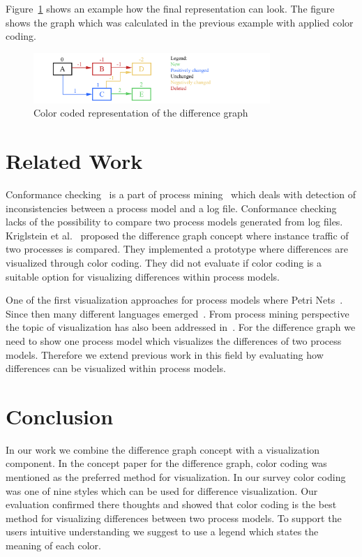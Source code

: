 \documentclass{llncs}
\begin{document}
Figure~\ref{fig:DiffGraphVisualization} shows an example how the final representation can look. The figure shows the graph which was calculated in the previous example with applied color coding.

\begin{figure}
	\centering
	\includegraphics[width=0.8\textwidth]{Images/ColorCodedGraph.PNG}
	\caption{Color coded representation of the difference graph}
	\label{fig:DiffGraphVisualization}
\end{figure}

\section{Related Work}  %
\label{sec:RelatedWork}

Conformance checking~\cite{lit:ConformanceCheckingOfProcesses} is a part of process mining~\cite{lit:PMDiscoveryConformanceEnhancement,lit:BusinnessProcessMiningAnIndustrialAppliction} which deals with detection of inconsistencies between a process model and a log file. Conformance checking lacks of the possibility to compare two process models generated from log files. Kriglstein et al.~\cite{lit:VisuApprDiffAnalysis} proposed the difference graph concept where instance traffic of two processes is compared. They implemented a prototype where differences are visualized through color coding. They did not evaluate if color coding is a suitable option for visualizing differences within process models.

One of the first visualization approaches for process models where Petri Nets~\cite{lit:Petrinet}. Since then many different languages emerged~\cite{lit:UML,lit:EPC,lit:YAWL}. From process mining perspective the topic of visualization has also been addressed in~\cite{lit:ProMFramework}. For the difference graph we need to show one process model which visualizes the differences of two process models. Therefore we extend previous work in this field by evaluating how differences can be visualized within process models.

\section{Conclusion} %
\label{sec:Conclusion}
In our work we combine the difference graph concept with a visualization component. In the concept paper for the difference graph, color coding was mentioned as the preferred method for visualization. In our survey color coding was one of nine styles which can be used for difference visualization. Our evaluation confirmed there thoughts and showed that color coding is the best method for visualizing differences between two process models. To support the users intuitive understanding we suggest to use a legend which states the meaning of each color.
\end{document}
